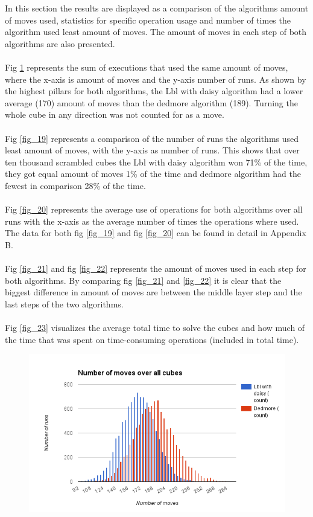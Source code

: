 \documentclass[a4paper,11pt]{kth-mag}
\begin{document}
In this section the results are displayed as a comparison of the algorithms amount of moves used, statistics for specific operation usage and number of times the algorithm used least amount of moves. The amount of moves in each step of both algorithms are also presented.\\\\ 
Fig \ref{fig_18} represents the sum of executions that used the same amount of moves, where the x-axis is amount of moves and the y-axis number of runs.
As shown by the highest pillars for both algorithms, the Lbl with daisy algorithm had a lower average (170) amount of moves than the dedmore algorithm (189). Turning the whole cube in any direction was not counted for as a move.\\\\
Fig \ref{fig_19} represents a comparison of the number of runs the algorithms used least amount of moves, with the y-axis as number of runs. 
This shows that over ten thousand scrambled cubes the Lbl with daisy algorithm won 71\% of the time, they got equal amount of moves 1\% of the time and dedmore algorithm had the fewest in comparison 28\% of the time.\\\\
Fig \ref{fig_20} represents the average use of operations for both algorithms over all runs with the x-axis as the average number of times the operations where used. \\The data for both fig \ref{fig_19} and fig \ref{fig_20} can be found in detail in Appendix B.\\\\ 
Fig \ref{fig_21} and fig \ref{fig_22} represents the amount of moves used in each step for both algorithms. By comparing fig \ref{fig_21} and \ref{fig_22} it is clear that the biggest difference in amount of moves are between the middle layer step and the last steps of the two algorithms.\\\\
Fig \ref{fig_23} visualizes the average total time to solve the cubes and how much of the time that was spent on time-consuming operations (included in total time). 
\begin{figure}[h!]
	\centering
	\includegraphics[width= 1.1\textwidth]{figs/graphone.png}
	\caption{}
	\label{fig_18}
\end{figure}
\end{document}
